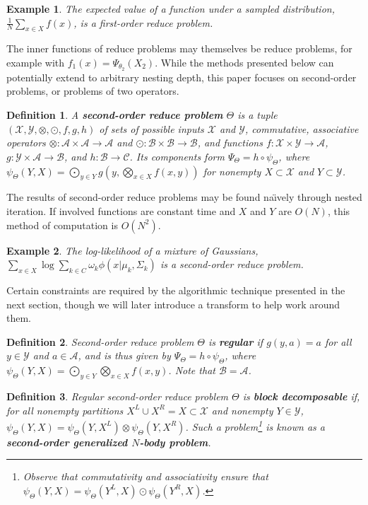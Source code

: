 \documentclass{article}
\newtheorem{definition} {Definition}
\newtheorem{example} {Example}
\newcommand{\killspace}{\vspace{-0.08in}}
\newcommand{\GNP}[1][\psi]{{#1}_{\Theta}}
\newcommand{\comp}{\mathbin{\circ}}
\newcommand{\kdleft}[1]{#1^{\!L}}
\newcommand{\kdright}[1]{#1^{\!R}}
\begin{document}
\begin{example}
  The expected value of a function under a sampled distribution,
  $\frac{1}{N} \sum_{x \in X} f(x)$, is a first-order reduce problem.
\end{example}
\killspace
The inner functions of reduce problems may themselves be reduce
problems, for example with $f_1(x) = \Psi_{\theta_2}(X_2)$.  While the
methods presented below can potentially extend to arbitrary nesting
depth, this paper focuses on second-order problems, or problems of two
operators.
\begin{definition}
  A {\bf second-order reduce problem} $\Theta$ is a tuple
  $(\mathcal{X},\mathcal{Y},\otimes,\odot,f,g,h)$ of sets of possible
  inputs $\mathcal{X}$ and $\mathcal{Y}$, commutative, associative
  operators $\otimes \colon \mathcal{A} \times \mathcal{A} \to
  \mathcal{A}$ and $\odot \colon \mathcal{B} \times \mathcal{B} \to
  \mathcal{B}$, and functions $f \colon \mathcal{X} \times \mathcal{Y}
  \to \mathcal{A}$, $g \colon \mathcal{Y} \times \mathcal{A} \to
  \mathcal{B}$, and $h \colon \mathcal{B} \to \mathcal{C}$.  Its
  components form $\Psi_{\Theta} = h \comp \psi_{\Theta}$, where
  $\psi_{\Theta}(Y,X) = \bigodot_{y \in Y} g \left( y,\bigotimes_{x
  \in X} f(x,y) \right)$ for nonempty $X \subset \mathcal{X}$ and $Y
  \subset \mathcal{Y}$.
\end{definition}
\killspace
\noindent The results of second-order reduce problems may be found
na\"{\i}vely through nested iteration.  If involved functions are
constant time and $X$ and $Y$ are $O(N)$, this method of computation
is $O(N^2)$.
\begin{example}
  The log-likelihood of a mixture of Gaussians, $\sum_{x \in X} \log
  \sum_{k \in C} \omega_k \phi(x | \mu_k, \Sigma_k)$ is a second-order
  reduce problem.
\end{example}
\killspace
Certain constraints are required by the algorithmic technique
presented in the next section, though we will later introduce a
transform to help work around them.
\begin{definition}
  Second-order reduce problem $\Theta$ is {\bf regular} if $g(y,a) =
  a$ for all $y \in \mathcal{Y}$ and $a \in \mathcal{A}$, and is thus
  given by $\Psi_{\Theta} = h \comp \psi_{\Theta}$, where
  $\psi_{\Theta}(Y,X) = \bigodot_{y \in Y} \bigotimes_{x \in X}
  f(x,y)$.  Note that $\mathcal{B} = \mathcal{A}$.
\end{definition}
\begin{definition}
  Regular second-order reduce problem $\Theta$ is {\bf block
  decomposable} if, for all nonempty partitions $\kdleft{X} \cup \kdright{X}
  = X \subset \mathcal{X}$ and nonempty $Y \in \mathcal{Y}$,
  $\GNP(Y,X) = \GNP(Y,\kdleft{X}) \otimes \GNP(Y,\kdright{X})$.  Such a
  problem\footnote{Observe that commutativity and associativity ensure
  that $\GNP(Y,X) = \GNP(\kdleft{Y},X) \odot \GNP(\kdright{Y},X)$.} is known
  as a {\bf second-order generalized $N$-body problem}.
\end{definition}
\end{document}
